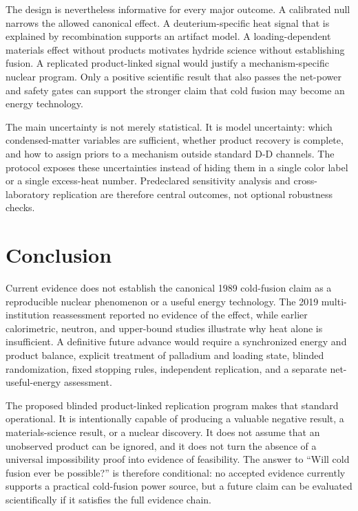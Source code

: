 \documentclass[conference]{IEEEtran}
\begin{document}
The design is nevertheless informative for every major outcome. A calibrated null narrows the allowed canonical effect. A deuterium-specific heat signal that is explained by recombination supports an artifact model. A loading-dependent materials effect without products motivates hydride science without establishing fusion. A replicated product-linked signal would justify a mechanism-specific nuclear program. Only a positive scientific result that also passes the net-power and safety gates can support the stronger claim that cold fusion may become an energy technology.

The main uncertainty is not merely statistical. It is model uncertainty: which condensed-matter variables are sufficient, whether product recovery is complete, and how to assign priors to a mechanism outside standard D-D channels. The protocol exposes these uncertainties instead of hiding them in a single color label or a single excess-heat number. Predeclared sensitivity analysis and cross-laboratory replication are therefore central outcomes, not optional robustness checks.

\section{Conclusion}
\label{sec:conclusion}
Current evidence does not establish the canonical 1989 cold-fusion claim as a reproducible nuclear phenomenon or a useful energy technology. The 2019 multi-institution reassessment reported no evidence of the effect, while earlier calorimetric, neutron, and upper-bound studies illustrate why heat alone is insufficient. A definitive future advance would require a synchronized energy and product balance, explicit treatment of palladium and loading state, blinded randomization, fixed stopping rules, independent replication, and a separate net-useful-energy assessment.

The proposed blinded product-linked replication program makes that standard operational. It is intentionally capable of producing a valuable negative result, a materials-science result, or a nuclear discovery. It does not assume that an unobserved product can be ignored, and it does not turn the absence of a universal impossibility proof into evidence of feasibility. The answer to ``Will cold fusion ever be possible?'' is therefore conditional: no accepted evidence currently supports a practical cold-fusion power source, but a future claim can be evaluated scientifically if it satisfies the full evidence chain.
\end{document}
